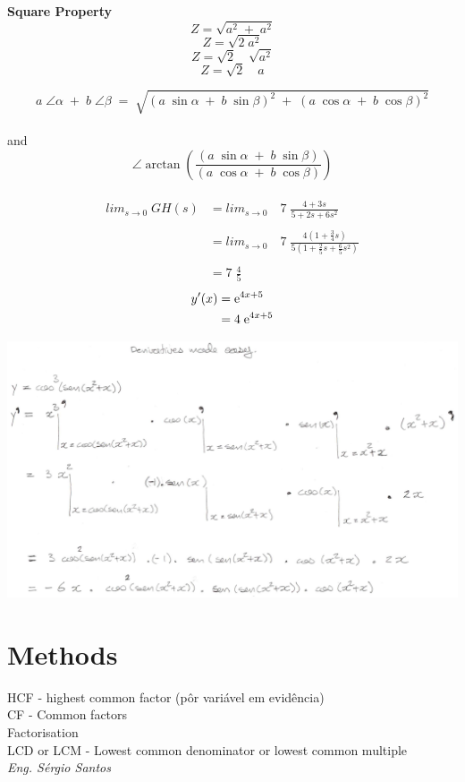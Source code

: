 \begin{minipage}[H]{0.3\linewidth}
\textbf{Square Property} \\
\[Z=\sqrt{a^2 \; + \; a^2}\]
\[Z=\sqrt{2 \; a^2}\]
\[Z=\sqrt{2} \quad \sqrt{a^2}\]
\[Z=\sqrt{2} \quad a\]
\end{minipage}
\vspace{1cm}
\[a \; \angle \alpha \; + \; b \; \angle \beta \; = \; \sqrt{(a \;  \sin \alpha \; + \; b \; \sin \beta)^2 \; + \; (a \; \cos \alpha \; + \; b \; \cos \beta)^2}\] \\
and \\
\[\angle \arctan(\frac{(a \; \sin \alpha \; + \; b \; \sin \beta)}{(a \; \cos \alpha \; + \; b \; \cos \beta)})\] \\
\begin{align*}
lim_{s \to 0} \; GH(s) & = lim_{s \to 0} \quad 7 \; \frac{4+3s}{5+2s+6s^2} \\ \\
& = lim_{s \to 0} \quad 7 \; \frac{4(1+\frac{3}{4}s)}{5(1+\frac{2}{5}s+\frac{6}{5}s^2)} \\ \\
& = 7 \; \frac{4}{5}
\end{align*}
\begin{align*}
y'(x) &= \mathrm{e}^{4x+5} \\
      &= 4 \; \mathrm{e}^{4x+5}
\end{align*}
\begin{minipage}{0.60\linewidth}
\includegraphics[scale=0.48]{./image/examples/derivativeasy.png}
\end{minipage}


\newpage
\section{Methods}
HCF - highest common factor (pôr variável em evidência) \\
CF - Common factors \\
Factorisation \\
LCD or LCM - Lowest common denominator or lowest common multiple \\
\newpage
\normalsize
\null \vfill
\textit{Eng. Sérgio Santos}

